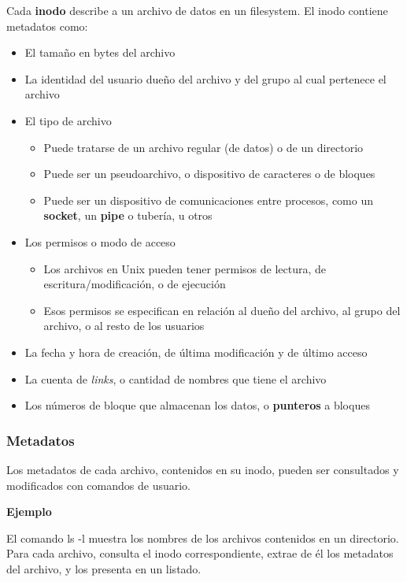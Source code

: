 \documentclass[spanish,a4paper,]{article}
\providecommand{\tightlist}{%
  \setlength{\itemsep}{0pt}\setlength{\parskip}{0pt}}
\begin{document}
Cada \textbf{inodo} describe a un archivo de datos en un filesystem. El
inodo contiene metadatos como:

\begin{itemize}
\tightlist
\item
  El tamaño en bytes del archivo
\item
  La identidad del usuario dueño del archivo y del grupo al cual
  pertenece el archivo
\item
  El tipo de archivo

  \begin{itemize}
  \tightlist
  \item
    Puede tratarse de un archivo regular (de datos) o de un directorio
  \item
    Puede ser un pseudoarchivo, o dispositivo de caracteres o de bloques
  \item
    Puede ser un dispositivo de comunicaciones entre procesos, como un
    \textbf{socket}, un \textbf{pipe} o tubería, u otros
  \end{itemize}
\item
  Los permisos o modo de acceso

  \begin{itemize}
  \tightlist
  \item
    Los archivos en Unix pueden tener permisos de lectura, de
    escritura/modificación, o de ejecución
  \item
    Esos permisos se especifican en relación al dueño del archivo, al
    grupo del archivo, o al resto de los usuarios
  \end{itemize}
\item
  La fecha y hora de creación, de última modificación y de último acceso
\item
  La cuenta de \emph{links}, o cantidad de nombres que tiene el archivo
\item
  Los números de bloque que almacenan los datos, o \textbf{punteros} a
  bloques
\end{itemize}

\hypertarget{metadatos-1}{%
\subsubsection{Metadatos}\label{metadatos-1}}

Los metadatos de cada archivo, contenidos en su inodo, pueden ser
consultados y modificados con comandos de usuario.

\textbf{Ejemplo}

El comando ls -l muestra los nombres de los archivos contenidos en un
directorio. Para cada archivo, consulta el inodo correspondiente, extrae
de él los metadatos del archivo, y los presenta en un listado.
\end{document}
